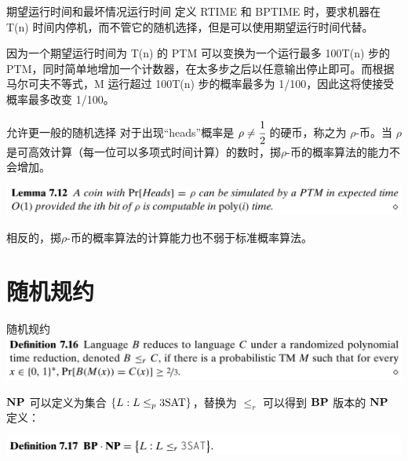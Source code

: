 \documentclass[UTF8,aspectratio=169,mathserif]{beamer}
\begin{document}
	\begin{frame}{期望运行时间和最坏情况运行时间}
		定义 RTIME 和 BPTIME 时，要求机器在 T(n) 时间内停机，而不管它的随机选择，但是可以使用期望运行时间代替。\newline
		
		因为一个期望运行时间为 T(n) 的 PTM 可以变换为一个运行最多 100T(n) 步的 PTM，同时简单地增加一个计数器，在太多步之后以任意输出停止即可。而根据马尔可夫不等式，M 运行超过 100T(n) 步的概率最多为 1/100，因此这将使接受概率最多改变 1/100。
	\end{frame}

	\begin{frame}{允许更一般的随机选择}
		对于出现“heads”概率是 $\rho\neq\cfrac{1}{2}$ 的硬币，称之为 $\rho$-币。当 $\rho$ 是可高效计算（每一位可以多项式时间计算）的数时，掷$\rho$-币的概率算法的能力不会增加。\newline
		
		\includegraphics[width=\linewidth]{../../7/note.assets/image-20210509154955249.png}\newline
		
		相反的，掷$\rho$-币的概率算法的计算能力也不弱于标准概率算法。
	\end{frame}
	
	\section{随机规约}
	\begin{frame}{随机规约}
		\includegraphics[width=\linewidth]{../../7/note.assets/image-20210509155949766.png}\newline
		
		$\bf NP$ 可以定义为集合 $\{L:L\le_p{\rm 3SAT}\}$，替换为 $\le_r$ 可以得到 $\bf BP$ 版本的 $\bf NP$ 定义：
		
		\includegraphics[width=\linewidth]{../../7/note.assets/image-20210509162341964.png}
	\end{frame}
\end{document}
